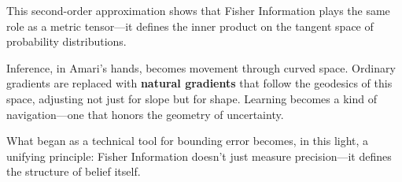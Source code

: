 This second-order approximation shows that Fisher Information plays the same role as a metric tensor—it defines the inner product on the tangent space of probability distributions.

Inference, in Amari’s hands, becomes movement through curved space. Ordinary gradients are replaced with \textbf{natural gradients} that follow the geodesics of this space, adjusting not just for slope but for shape. Learning becomes a kind of navigation—one that honors the geometry of uncertainty.

What began as a technical tool for bounding error becomes, in this light, a unifying principle:  
Fisher Information doesn’t just measure precision—it defines the structure of belief itself.
